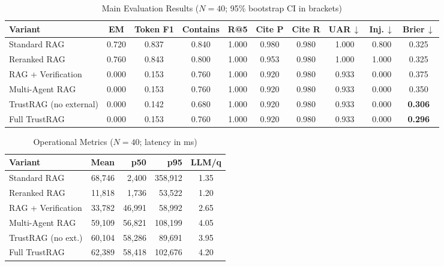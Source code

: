 \documentclass[conference]{IEEEtran}
\newcommand{\TR}{TrustRAG}
\begin{document}
\begin{table}[t]
\centering
\caption{Main Evaluation Results ($N=40$; 95\% bootstrap CI in brackets)}
\label{tab:main-results}
\footnotesize
\begin{tabular}{l c c c c c c c c c}
\toprule
\textbf{Variant} & \textbf{EM} & \textbf{Token F1} & \textbf{Contains} & \textbf{R@5} &
\textbf{Cite P} & \textbf{Cite R} & \textbf{UAR\,$\downarrow$} &
\textbf{Inj.\,$\downarrow$} & \textbf{Brier\,$\downarrow$} \\
\midrule
Standard RAG
  & 0.720 & 0.837 & 0.840 & 1.000
  & 0.980 & 0.980 & 1.000
  & 0.800 & 0.325 \\
Reranked RAG
  & 0.760 & 0.843 & 0.800 & 1.000
  & 0.953 & 0.980 & 1.000
  & 1.000 & 0.325 \\
RAG + Verification
  & 0.000 & 0.153 & 0.760 & 1.000
  & 0.920 & 0.980 & 0.933
  & 0.000 & 0.375 \\
Multi-Agent RAG
  & 0.000 & 0.153 & 0.760 & 1.000
  & 0.920 & 0.980 & 0.933
  & 0.000 & 0.350 \\
\TR{} (no external)
  & 0.000 & 0.142 & 0.680 & 1.000
  & 0.920 & 0.980 & 0.933
  & 0.000 & \textbf{0.306} \\
Full \TR{}
  & 0.000 & 0.153 & 0.760 & 1.000
  & 0.920 & 0.980 & 0.933
  & 0.000 & \textbf{0.296} \\
\bottomrule
\end{tabular}
\end{table}

\begin{table}[t]
\centering
\caption{Operational Metrics ($N=40$; latency in ms)}
\label{tab:latency-results}
\footnotesize
\begin{tabular}{l r r r c}
\toprule
\textbf{Variant} & \textbf{Mean} & \textbf{p50} & \textbf{p95} & \textbf{LLM/q} \\
\midrule
Standard RAG        & 68,746  & 2,400   & 358,912 & 1.35 \\
Reranked RAG        & 11,818  & 1,736   & 53,522  & 1.20 \\
RAG + Verification  & 33,782  & 46,991  & 58,992  & 2.65 \\
Multi-Agent RAG     & 59,109  & 56,821  & 108,199 & 4.05 \\
\TR{} (no ext.)     & 60,104  & 58,286  & 89,691  & 3.95 \\
Full \TR{}          & 62,389  & 58,418  & 102,676 & 4.20 \\
\bottomrule
\end{tabular}
\end{table}
\end{document}
